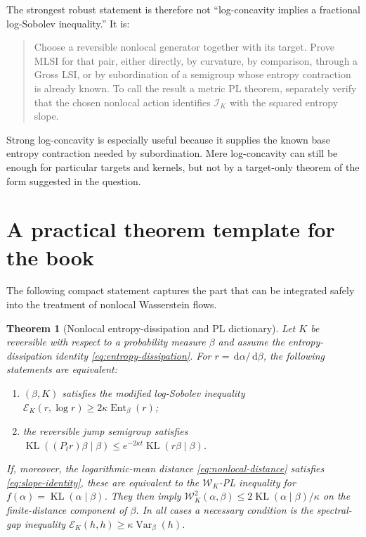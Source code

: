 \documentclass[11pt]{article}
\newtheorem{theorem}{Theorem}[section]
\theoremstyle{definition}
\DeclareMathOperator{\Ent}{Ent}
\DeclareMathOperator{\Var}{Var}
\DeclareMathOperator{\KL}{KL}
\newcommand{\dd}{\,\mathrm d}
\newcommand{\cE}{\mathcal E}
\newcommand{\cI}{\mathcal I}
\newcommand{\cW}{\mathcal W}
\begin{document}
The strongest robust statement is therefore not ``log-concavity implies a
fractional log-Sobolev inequality.''  It is:
\begin{quote}
Choose a reversible nonlocal generator together with its target.  Prove MLSI
for that pair, either directly, by curvature, by comparison, through a Gross
LSI, or by subordination of a semigroup whose entropy contraction is already
known.  To call the result a metric PL theorem, separately verify that the
chosen nonlocal action identifies $\cI_K$ with the squared entropy slope.
\end{quote}

Strong log-concavity is especially useful because it supplies the known base
entropy contraction needed by subordination.  Mere log-concavity can still be
enough for particular targets and kernels, but not by a target-only theorem
of the form suggested in the question.

\section{A practical theorem template for the book}

The following compact statement captures the part that can be integrated
safely into the treatment of nonlocal Wasserstein flows.

\begin{theorem}[Nonlocal entropy-dissipation and PL dictionary]
\label{thm:book-template}
Let $K$ be reversible with respect to a probability measure $\beta$ and
assume the entropy-dissipation identity \eqref{eq:entropy-dissipation}.  For
$r=\dd\alpha/\dd\beta$, the following statements are equivalent:
\begin{enumerate}[label=(\roman*)]
  \item $(\beta,K)$ satisfies the modified log-Sobolev inequality
  $\cE_K(r,\log r)\geq2\kappa\Ent_\beta(r)$;
  \item the reversible jump semigroup satisfies
  $\KL((P_t r)\beta\mid\beta)
  \leq e^{-2\kappa t}\KL(r\beta\mid\beta)$.
\end{enumerate}
If, moreover, the logarithmic-mean distance \eqref{eq:nonlocal-distance}
satisfies \eqref{eq:slope-identity}, these are equivalent to the
$\cW_K$-PL inequality for $f(\alpha)=\KL(\alpha\mid\beta)$.  They then imply
$\cW_K^2(\alpha,\beta)\leq2\KL(\alpha\mid\beta)/\kappa$ on the finite-distance
component of $\beta$.  In all cases a necessary condition is the spectral-gap
inequality $\cE_K(h,h)\geq\kappa\Var_\beta(h)$.
\end{theorem}
\end{document}
